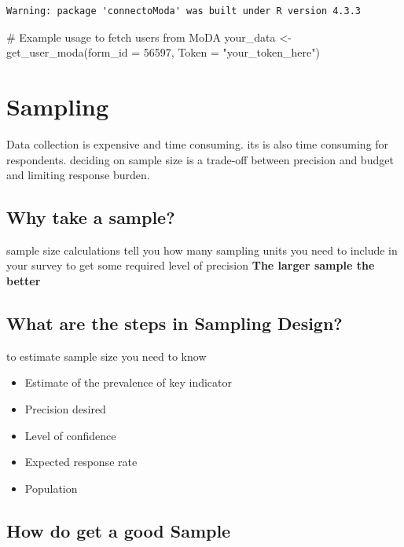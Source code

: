 \documentclass[
  letterpaper,
  DIV=11,
  numbers=noendperiod]{scrreprt}
\newenvironment{Shaded}{\begin{snugshade}}{\end{snugshade}}
\newcommand{\AttributeTok}[1]{\textcolor[rgb]{0.40,0.45,0.13}{#1}}
\newcommand{\CommentTok}[1]{\textcolor[rgb]{0.37,0.37,0.37}{#1}}
\newcommand{\DecValTok}[1]{\textcolor[rgb]{0.68,0.00,0.00}{#1}}
\newcommand{\FunctionTok}[1]{\textcolor[rgb]{0.28,0.35,0.67}{#1}}
\newcommand{\NormalTok}[1]{\textcolor[rgb]{0.00,0.23,0.31}{#1}}
\newcommand{\OtherTok}[1]{\textcolor[rgb]{0.00,0.23,0.31}{#1}}
\newcommand{\StringTok}[1]{\textcolor[rgb]{0.13,0.47,0.30}{#1}}
\providecommand{\tightlist}{%
  \setlength{\itemsep}{0pt}\setlength{\parskip}{0pt}}\usepackage{longtable,booktabs,array}
\begin{document}
\begin{verbatim}
Warning: package 'connectoModa' was built under R version 4.3.3
\end{verbatim}

\begin{Shaded}
\begin{Highlighting}[]
\CommentTok{\# Example usage to fetch users from MoDA}
\NormalTok{your\_data }\OtherTok{\textless{}{-}} \FunctionTok{get\_user\_moda}\NormalTok{(}\AttributeTok{form\_id =} \DecValTok{56597}\NormalTok{, }\AttributeTok{Token =} \StringTok{"your\_token\_here"}\NormalTok{)}
\end{Highlighting}
\end{Shaded}

\section{Sampling}\label{sampling}

Data collection is expensive and time consuming. its is also time
consuming for respondents. deciding on sample size is a trade-off
between precision and budget and limiting response burden.

\subsection{Why take a sample?}\label{why-take-a-sample}

sample size calculations tell you how many sampling units you need to
include in your survey to get some required level of precision
\textbf{The larger sample the better}

\subsection{What are the steps in Sampling
Design?}\label{what-are-the-steps-in-sampling-design}

to estimate sample size you need to know

\begin{itemize}
\tightlist
\item
  Estimate of the prevalence of key indicator
\item
  Precision desired
\item
  Level of confidence
\item
  Expected response rate
\item
  Population
\end{itemize}

\subsection{How do get a good Sample}\label{how-do-get-a-good-sample}
\end{document}
